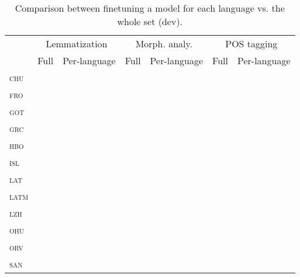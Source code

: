 \documentclass{../acl_latex.tex}
\begin{document}
\begin{table*}[t]
\centering
\begin{tabular}{lrrrrrr}
\toprule
                 & \multicolumn{2}{c}{Lemmatization} & \multicolumn{2}{c}{Morph. analy.} & \multicolumn{2}{c}{POS tagging} \\
                 & Full     & Per-language & Full   & Per-language  & Full        & Per-language     \\ \midrule
\textsc{chu}     &          &              &        &               &             &                  \\ 
\textsc{fro}     &          &              &        &               &             &                  \\
\textsc{got}     &          &              &        &               &             &                  \\
\textsc{grc}     &          &              &        &               &             &                  \\
\textsc{hbo}     &          &              &        &               &             &                  \\
\textsc{isl}     &          &              &        &               &             &                  \\
\textsc{lat}     &          &              &        &               &             &                  \\
\textsc{latm}    &          &              &        &               &             &                  \\
\textsc{lzh}     &          &              &        &               &             &                  \\
\textsc{ohu}     &          &              &        &               &             &                  \\
\textsc{orv}     &          &              &        &               &             &                  \\
\textsc{san}     &          &              &        &               &             &                  \\ \bottomrule 
\end{tabular}
\caption{
    Comparison between finetuning a model for each language vs. the whole set (dev).
}
\end{table*}
\end{document}
